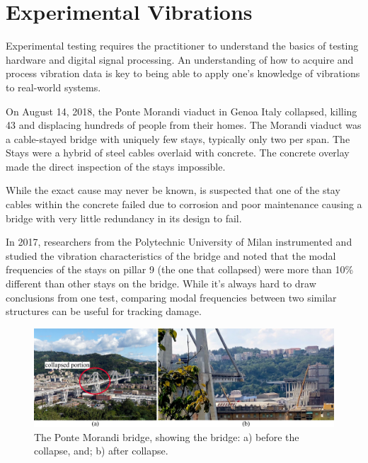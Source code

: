 \documentclass[12pt,letter]{article}
\begin{document}
	
	\setcounter{section}{8}	
	\setcounter{figure}{0}   
	\renewcommand\thefigure{\thesection.\arabic{figure}}
	\setcounter{equation}{0}   
	\renewcommand\theequation{\thesection.\arabic{equation}}

	\section{Experimental Vibrations}
	
Experimental testing requires the practitioner to understand the basics of testing hardware and digital signal processing. An understanding of how to acquire and process vibration data is key to being able to apply one's knowledge of vibrations to real-world systems.


\begin{vibration_case_study}

	On August 14, 2018, the Ponte Morandi viaduct in Genoa Italy collapsed, killing 43 and displacing hundreds of people from their homes. The Morandi viaduct was a cable-stayed bridge with uniquely few stays, typically only two per span. The Stays were a hybrid of steel cables overlaid with concrete. The concrete overlay made the direct inspection of the stays impossible. 
	
	While the exact cause may never be known, is suspected that one of the stay cables within the concrete failed due to corrosion and poor maintenance causing a bridge with very little redundancy in its design to fail\protect\footnotemark[1].
	
	In 2017, researchers from the Polytechnic University of Milan instrumented and studied the vibration characteristics of the bridge and noted that the modal frequencies of the stays on pillar 9 (the one that collapsed) were more than 10\% different than other stays on the bridge. While it's always hard to draw conclusions from one test, comparing modal frequencies between two similar structures can be useful for tracking damage. 
 
	\begin{figure}[H]
		\centering
		\includegraphics[width=6in]{../figures/ponte_morandi_bridge}
		\caption{The Ponte Morandi bridge, showing the bridge: a) before the collapse\protect\footnotemark[2], and; b) after collapse\protect\footnotemark[3]. }
	\end{figure}
		

\end{vibration_case_study}
\end{document}
